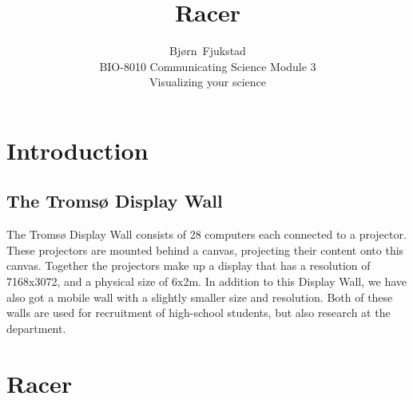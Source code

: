 \documentclass[12pt,journal,compsoc]{IEEEtran}
\begin{document}
\title{Racer}
\author{Bjørn~Fjukstad \\ BIO-8010 Communicating Science Module 3\\ Visualizing
your science} 
\maketitle

\section{Introduction} 


\subsection{The Tromsø Display Wall}
The Tromsø Display Wall consists of 28 computers each connected to a projector.
These projectors are mounted behind a canvas, projecting their content onto this
canvas. Together the projectors make up a display that has a resolution of 
7168x3072, and a physical size of 6x2m. In
addition to this Display Wall, we have also got a mobile wall with a slightly
smaller size and resolution. Both of these walls are used for
recruitment of high-school students, but also research at the department.

\section{Racer}
    
\end{document}
